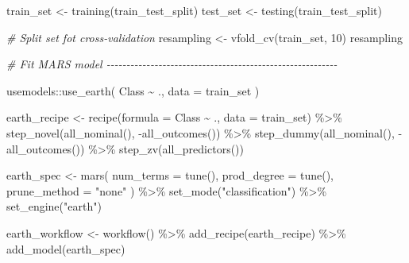 \documentclass[
]{book}
\newenvironment{Shaded}{\begin{snugshade}}{\end{snugshade}}
\newcommand{\AttributeTok}[1]{\textcolor[rgb]{0.77,0.63,0.00}{#1}}
\newcommand{\CommentTok}[1]{\textcolor[rgb]{0.56,0.35,0.01}{\textit{#1}}}
\newcommand{\DecValTok}[1]{\textcolor[rgb]{0.00,0.00,0.81}{#1}}
\newcommand{\FunctionTok}[1]{\textcolor[rgb]{0.00,0.00,0.00}{#1}}
\newcommand{\NormalTok}[1]{#1}
\newcommand{\OtherTok}[1]{\textcolor[rgb]{0.56,0.35,0.01}{#1}}
\newcommand{\SpecialCharTok}[1]{\textcolor[rgb]{0.00,0.00,0.00}{#1}}
\newcommand{\StringTok}[1]{\textcolor[rgb]{0.31,0.60,0.02}{#1}}
\begin{document}
\begin{Shaded}
\begin{Highlighting}[]
\NormalTok{train\_set }\OtherTok{\textless{}{-}} \FunctionTok{training}\NormalTok{(train\_test\_split)}
\NormalTok{test\_set }\OtherTok{\textless{}{-}} \FunctionTok{testing}\NormalTok{(train\_test\_split)}

\CommentTok{\# Split set fot cross{-}validation}
\NormalTok{resampling }\OtherTok{\textless{}{-}} \FunctionTok{vfold\_cv}\NormalTok{(train\_set, }\DecValTok{10}\NormalTok{)}
\NormalTok{resampling}


\CommentTok{\# Fit MARS model {-}{-}{-}{-}{-}{-}{-}{-}{-}{-}{-}{-}{-}{-}{-}{-}{-}{-}{-}{-}{-}{-}{-}{-}{-}{-}{-}{-}{-}{-}{-}{-}{-}{-}{-}{-}{-}{-}{-}{-}{-}{-}{-}{-}{-}{-}{-}{-}{-}{-}{-}{-}{-}{-}{-}{-}{-}{-}}

\NormalTok{usemodels}\SpecialCharTok{::}\FunctionTok{use\_earth}\NormalTok{(}
\NormalTok{  Class }\SpecialCharTok{\textasciitilde{}}\NormalTok{ .,}
  \AttributeTok{data =}\NormalTok{ train\_set}
\NormalTok{  )}

\NormalTok{earth\_recipe }\OtherTok{\textless{}{-}} 
  \FunctionTok{recipe}\NormalTok{(}\AttributeTok{formula =}\NormalTok{ Class }\SpecialCharTok{\textasciitilde{}}\NormalTok{ ., }\AttributeTok{data =}\NormalTok{ train\_set) }\SpecialCharTok{\%\textgreater{}\%} 
  \FunctionTok{step\_novel}\NormalTok{(}\FunctionTok{all\_nominal}\NormalTok{(), }\SpecialCharTok{{-}}\FunctionTok{all\_outcomes}\NormalTok{()) }\SpecialCharTok{\%\textgreater{}\%} 
  \FunctionTok{step\_dummy}\NormalTok{(}\FunctionTok{all\_nominal}\NormalTok{(), }\SpecialCharTok{{-}}\FunctionTok{all\_outcomes}\NormalTok{()) }\SpecialCharTok{\%\textgreater{}\%} 
  \FunctionTok{step\_zv}\NormalTok{(}\FunctionTok{all\_predictors}\NormalTok{()) }

\NormalTok{earth\_spec }\OtherTok{\textless{}{-}} 
  \FunctionTok{mars}\NormalTok{(}
    \AttributeTok{num\_terms =} \FunctionTok{tune}\NormalTok{(),}
    \AttributeTok{prod\_degree =} \FunctionTok{tune}\NormalTok{(),}
    \AttributeTok{prune\_method =} \StringTok{"none"}
\NormalTok{    ) }\SpecialCharTok{\%\textgreater{}\%} 
  \FunctionTok{set\_mode}\NormalTok{(}\StringTok{"classification"}\NormalTok{) }\SpecialCharTok{\%\textgreater{}\%} 
  \FunctionTok{set\_engine}\NormalTok{(}\StringTok{"earth"}\NormalTok{) }

\NormalTok{earth\_workflow }\OtherTok{\textless{}{-}} 
  \FunctionTok{workflow}\NormalTok{() }\SpecialCharTok{\%\textgreater{}\%} 
  \FunctionTok{add\_recipe}\NormalTok{(earth\_recipe) }\SpecialCharTok{\%\textgreater{}\%} 
  \FunctionTok{add\_model}\NormalTok{(earth\_spec) }


\end{Highlighting}
\end{Shaded}
\end{document}
